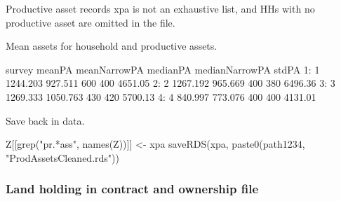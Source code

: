 Productive asset records \textsf{xpa} is not an exhaustive list, and HHs with no productive asset are omitted in the file. \gobblepars

Mean assets for household and productive assets.
\begin{Schunk}
\begin{Soutput}
   survey   meanPA meanNarrowPA medianPA medianNarrowPA   stdPA
1:      1 1244.203      927.511      600            400 4651.05
2:      2 1267.192      965.669      400            380 6496.36
3:      3 1269.333     1050.763      430            420 5700.13
4:      4  840.997      773.076      400            400 4131.01
\end{Soutput}
\end{Schunk}
Save back in data.
\begin{Schunk}
\begin{Sinput}
Z[[grep("pr.*ass", names(Z))]] <- xpa
saveRDS(xpa, paste0(path1234, "ProdAssetsCleaned.rds"))
\end{Sinput}
\end{Schunk}


\subsubsection{Land holding in contract and ownership file}

